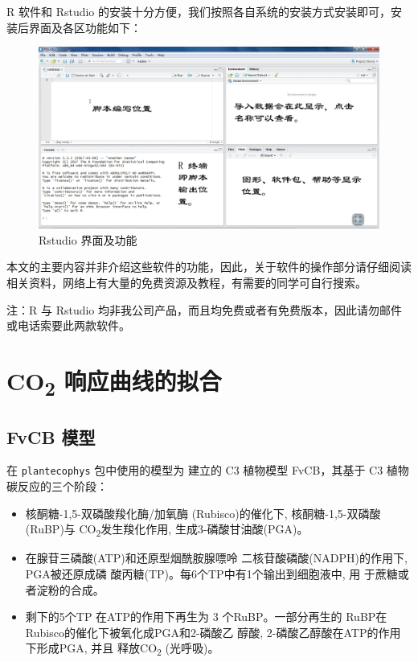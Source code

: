 \documentclass[]{krantz}
\renewenvironment{quote}{\begin{VF}}{\end{VF}}
\theoremstyle{definition}
\theoremstyle{definition}
\theoremstyle{definition}
\theoremstyle{remark}
\begin{document}
R 软件和 Rstudio
的安装十分方便，我们按照各自系统的安装方式安装即可，安装后界面及各区功能如下：

\begin{figure}
\includegraphics[width=4.55in]{images/rstudio} \caption{Rstudio 界面及功能}\label{fig:unnamed-chunk-1}
\end{figure}

本文的主要内容并非介绍这些软件的功能，因此，关于软件的操作部分请仔细阅读相关资料，网络上有大量的免费资源及教程，有需要的同学可自行搜索。

\begin{quote}
注：R 与 Rstudio
均非我公司产品，而且均免费或者有免费版本，因此请勿邮件或电话索要此两款软件。
\end{quote}

\cleardoublepage

\chapter{\texorpdfstring{CO\textsubscript{2}
响应曲线的拟合}{CO2 响应曲线的拟合}}\label{response_fit}

\section{FvCB 模型}\label{fvcb_mod}

在 \texttt{plantecophys} 包中使用的模型为 \citet{Farquhar1980A} 建立的
C3 植物模型 FvCB，其基于 C3 植物碳反应的三个阶段：

\begin{itemize}
\item
  核酮糖-1,5-双磷酸羧化酶/加氧酶 (Rubisco)的催化下,
  核酮糖-1,5-双磷酸(RuBP)与 CO\textsubscript{2}发生羧化作用,
  生成3-磷酸甘油酸(PGA)。
\item
  在腺苷三磷酸(ATP)和还原型烟酰胺腺嘌呤 二核苷酸磷酸(NADPH)的作用下,
  PGA被还原成磷 酸丙糖(TP)。每6个TP中有1个输出到细胞液中, 用
  于蔗糖或者淀粉的合成。
\item
  剩下的5个TP 在ATP的作用下再生为 3 个RuBP。一部分再生的
  RuBP在Rubisco的催化下被氧化成PGA和2-磷酸乙 醇酸,
  2-磷酸乙醇酸在ATP的作用下形成PGA, 并且 释放CO\textsubscript{2}
  (光呼吸)。
\end{itemize}
\end{document}
